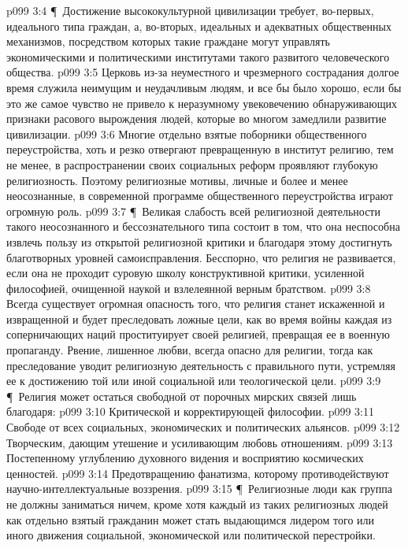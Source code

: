 \vs p099 3:4 \P\ Достижение высококультурной цивилизации требует, во\hyp{}первых, идеального типа граждан, а, во\hyp{}вторых, идеальных и адекватных общественных механизмов, посредством которых такие граждане могут управлять экономическими и политическими институтами такого развитого человеческого общества.
\vs p099 3:5 Церковь из\hyp{}за неуместного и чрезмерного сострадания долгое время служила неимущим и неудачливым людям, и все бы было хорошо, если бы это же самое чувство не привело к неразумному увековечению обнаруживающих признаки расового вырождения людей, которые во многом замедлили развитие цивилизации.
\vs p099 3:6 Многие отдельно взятые поборники общественного переустройства, хоть и резко отвергают превращенную в институт религию, тем не менее, в распространении своих социальных реформ проявляют глубокую религиозность. Поэтому религиозные мотивы, личные и более и менее неосознанные, в современной программе общественного переустройства играют огромную роль.
\vs p099 3:7 \P\ Великая слабость всей религиозной деятельности такого неосознанного и бессознательного типа состоит в том, что она неспособна извлечь пользу из открытой религиозной критики и благодаря этому достигнуть благотворных уровней самоисправления. Бесспорно, что религия не развивается, если она не проходит суровую школу конструктивной критики, усиленной философией, очищенной наукой и взлелеянной верным братством.
\vs p099 3:8 Всегда существует огромная опасность того, что религия станет искаженной и извращенной и будет преследовать ложные цели, как во время войны каждая из соперничающих наций проституирует своей религией, превращая ее в военную пропаганду. Рвение, лишенное любви, всегда опасно для религии, тогда как преследование уводит религиозную деятельность с правильного пути, устремляя ее к достижению той или иной социальной или теологической цели.
\vs p099 3:9 \P\ Религия может остаться свободной от порочных мирских связей лишь благодаря:
\vs p099 3:10 \bibnobreakspace Критической и корректирующей философии.
\vs p099 3:11 \bibnobreakspace Свободе от всех социальных, экономических и политических альянсов.
\vs p099 3:12 \bibnobreakspace Творческим, дающим утешение и усиливающим любовь отношениям.
\vs p099 3:13 \bibnobreakspace Постепенному углублению духовного видения и восприятию космических ценностей.
\vs p099 3:14 \bibnobreakspace Предотвращению фанатизма, которому противодействуют научно\hyp{}интеллектуальные воззрения.
\vs p099 3:15 \P\ Религиозные люди как группа не должны заниматься ничем, кроме  хотя каждый из таких религиозных людей как отдельно взятый гражданин может стать выдающимся лидером того или иного движения социальной, экономической или политической перестройки.
